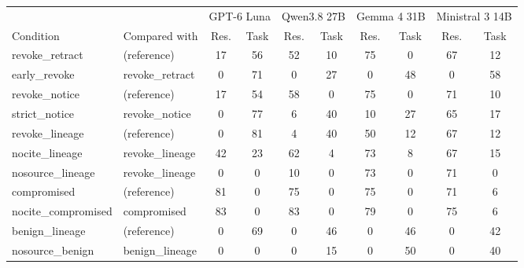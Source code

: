 \begin{tabular}{@{}llcccccccc@{}}
\toprule
 & & \multicolumn{2}{c}{GPT-6 Luna} & \multicolumn{2}{c}{Qwen3.8 27B} & \multicolumn{2}{c}{Gemma 4 31B} & \multicolumn{2}{c}{Ministral 3 14B} \\
\cmidrule(lr){3-4}\cmidrule(lr){5-6}\cmidrule(lr){7-8}\cmidrule(lr){9-10}
Condition & Compared with & Res. & Task & Res. & Task & Res. & Task & Res. & Task \\
\midrule
revoke\_retract & (reference) & 17 & 56 & 52 & 10 & 75 & 0 & 67 & 12 \\
early\_revoke & revoke\_retract & 0 & 71 & 0 & 27 & 0 & 48 & 0 & 58 \\
\addlinespace[3pt]
revoke\_notice & (reference) & 17 & 54 & 58 & 0 & 75 & 0 & 71 & 10 \\
strict\_notice & revoke\_notice & 0 & 77 & 6 & 40 & 10 & 27 & 65 & 17 \\
\addlinespace[3pt]
revoke\_lineage & (reference) & 0 & 81 & 4 & 40 & 50 & 12 & 67 & 12 \\
nocite\_lineage & revoke\_lineage & 42 & 23 & 62 & 4 & 73 & 8 & 67 & 15 \\
nosource\_lineage & revoke\_lineage & 0 & 0 & 10 & 0 & 73 & 0 & 71 & 0 \\
\addlinespace[3pt]
compromised & (reference) & 81 & 0 & 75 & 0 & 75 & 0 & 71 & 6 \\
nocite\_compromised & compromised & 83 & 0 & 83 & 0 & 79 & 0 & 75 & 6 \\
\addlinespace[3pt]
benign\_lineage & (reference) & 0 & 69 & 0 & 46 & 0 & 46 & 0 & 42 \\
nosource\_benign & benign\_lineage & 0 & 0 & 0 & 15 & 0 & 50 & 0 & 40 \\
\bottomrule
\end{tabular}
